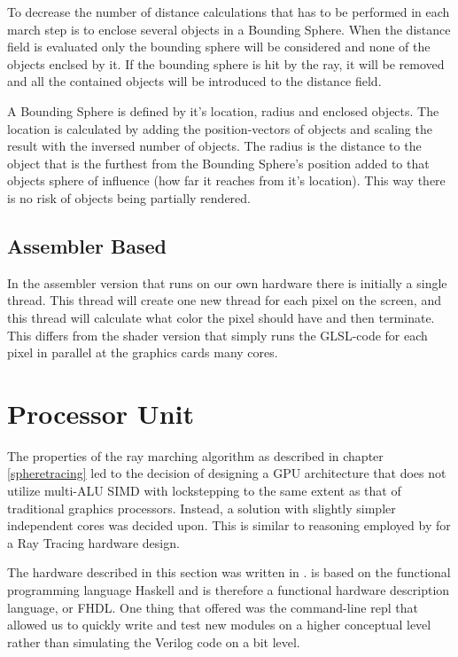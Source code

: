 			To decrease the number of distance calculations that has
			to be performed in each march step is to enclose several objects in
			a Bounding Sphere. When the distance field is evaluated only the
			bounding sphere will be considered and none of the objects enclsed
			by it. If the bounding sphere is hit by the ray, it will be removed
			and all the contained objects will be introduced to the distance
			field. 

			A Bounding Sphere is defined by it's location, radius and enclosed objects.
			The location is calculated by adding the position-vectors of objects
			and scaling the result with the inversed number of objects. The radius
			is the distance to the object that is the furthest from the Bounding
			Sphere's position added to that objects sphere of influence (how far
			it reaches from it's location). This way there is no risk of objects 
			being partially rendered.


		\subsection{Assembler Based}

			In the assembler version that runs on our own hardware there is
			initially a single thread. This thread will create one new thread
			for each pixel on the screen, and this thread will calculate what 
			color the pixel should have and then terminate. This differs from 
			the shader version that simply runs the GLSL-code for each pixel
			in parallel at the graphics cards many cores.

	\section{Processor Unit} \label{implproc}

		The properties of the ray marching algorithm as described in chapter
		\ref{spheretracing} led to the decision of designing a GPU architecture
		that does not utilize multi-ALU SIMD with lockstepping to the same
		extent as that of traditional graphics processors. Instead, a solution 
		with slightly simpler independent cores was decided upon. This is 
		similar to reasoning employed by \cite{Woop2005} for a Ray Tracing 
		hardware design.

		The hardware described in this section was written in \clash. \clash is
		based on the functional programming language Haskell and is therefore a
		functional hardware description language, or FHDL. One thing that
		\clash offered was the command-line repl that allowed us to quickly
		write and test new modules on a higher conceptual level rather than
		simulating the Verilog code on a bit level.

